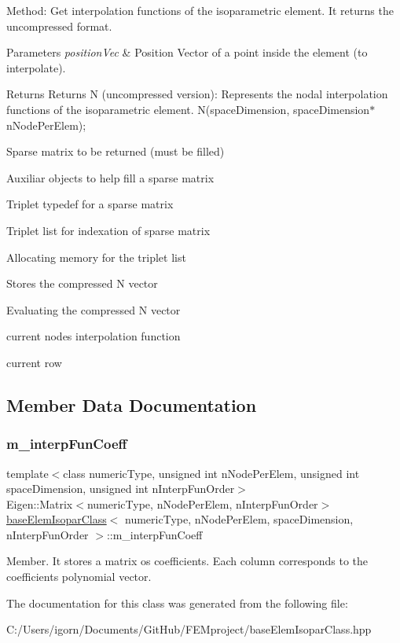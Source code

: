 Method\+: Get interpolation functions of the isoparametric element. It returns the uncompressed format. 
\begin{DoxyParams}{Parameters}
{\em position\+Vec} & Position Vector of a point inside the element (to interpolate). \\
\hline
\end{DoxyParams}
\begin{DoxyReturn}{Returns}
Returns N (uncompressed version)\+: Represents the nodal interpolation functions of the isoparametric element. N(space\+Dimension, space\+Dimension$\ast$n\+Node\+Per\+Elem); 
\end{DoxyReturn}
Sparse matrix to be returned (must be filled)

Auxiliar objects to help fill a sparse matrix

Triplet typedef for a sparse matrix

Triplet list for indexation of sparse matrix

Allocating memory for the triplet list

Stores the compressed N vector

Evaluating the compressed N vector

current node\textquotesingle{}s interpolation function

current row 

\subsection{Member Data Documentation}
\mbox{\label{classbase_elem_isopar_class_a0f1b22b54347906b42755bb331879a5d}} 
\subsubsection{\texorpdfstring{m\+\_\+interp\+Fun\+Coeff}{m\_interpFunCoeff}}
{\footnotesize\ttfamily template$<$class numeric\+Type, unsigned int n\+Node\+Per\+Elem, unsigned int space\+Dimension, unsigned int n\+Interp\+Fun\+Order$>$ \\
Eigen\+::\+Matrix$<$numeric\+Type, n\+Node\+Per\+Elem, n\+Interp\+Fun\+Order$>$ \mbox{\hyperlink{classbase_elem_isopar_class}{base\+Elem\+Isopar\+Class}}$<$ numeric\+Type, n\+Node\+Per\+Elem, space\+Dimension, n\+Interp\+Fun\+Order $>$\+::m\+\_\+interp\+Fun\+Coeff\hspace{0.3cm}{\ttfamily [protected]}}

Member. It stores a matrix os coefficients. Each column corresponds to the coefficient\textquotesingle{}s polynomial vector. 

The documentation for this class was generated from the following file\+:\begin{DoxyCompactItemize}
\item 
C\+:/\+Users/igorn/\+Documents/\+Git\+Hub/\+F\+E\+Mproject/base\+Elem\+Isopar\+Class.\+hpp\end{DoxyCompactItemize}
